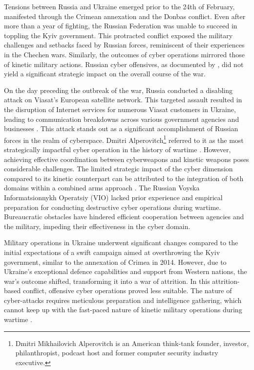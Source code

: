 Tensions between Russia and Ukraine emerged prior to the 24th of February, manifested through the Crimean annexation and the Donbas conflict. Even after more than a year of fighting, the Russian Federation was unable to succeed in toppling the Kyiv government. This protracted conflict exposed the military challenges and setbacks faced by Russian forces, reminiscent of their experiences in the Chechen wars. Similarly, the outcomes of cyber operations mirrored those of kinetic military actions. Russian cyber offensives, as documented by \textcite{baetman_2022_russias}, did not yield a significant strategic impact on the overall course of the war.

On the day preceding the outbreak of the war, Russia conducted a disabling attack on Viasat's European satellite network. This targeted assault resulted in the disruption of Internet services for numerous Viasat customers in Ukraine, leading to communication breakdowns across various government agencies and businesses \autocite{willett_2022_the}. This attack stands out as a significant accomplishment of Russian forces in the realm of cyberspace. Dmitri Alperovitch\footnote{ Dmitri Mikhailovich Alperovitch is an American think-tank founder, investor, philanthropist, podcast host and former computer security industry executive.} referred to it as the most strategically impactful cyber operation in the history of wartime \autocite{baetman_2022_russias}. However, achieving effective coordination between cyberweapons and kinetic weapons poses considerable challenges. The limited strategic impact of the cyber dimension compared to its kinetic counterpart can be attributed to the integration of both domains within a combined arms approach \autocite{wilde_2022_cyber}. The Russian Voyska Informatsionnykh Operatsiy (VIO) lacked prior experience and empirical preparation for conducting destructive cyber operations during wartime. Bureaucratic obstacles have hindered efficient cooperation between agencies and the military, impeding their effectiveness in the cyber domain.

Military operations in Ukraine underwent significant changes compared to the initial expectations of a swift campaign aimed at overthrowing the Kyiv government, similar to the annexation of Crimea in 2014. However, due to Ukraine's exceptional defence capabilities and support from Western nations, the war's outcome shifted, transforming it into a war of attrition. In this attrition-based conflict, offensive cyber operations proved less suitable. The nature of cyber-attacks requires meticulous preparation and intelligence gathering, which cannot keep up with the fast-paced nature of kinetic military operations during wartime \autocite{beecroft_2022_evaluating}.

